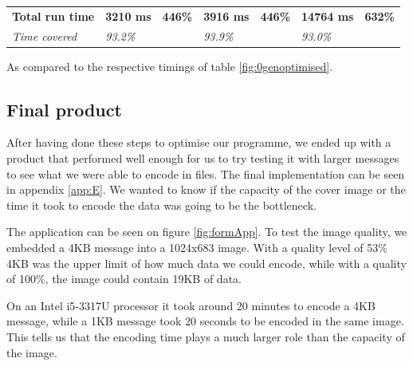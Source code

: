 \begin{table}[H]
\begin{tabular}{@{}lllllll@{}}
        \textbf{Total run time} & \textbf{3210 ms}                                                                          & \textbf{446\%}                                                                 & \textbf{3916 ms}                                                                           & \textbf{446\%}                                                                & \textbf{14764 ms}                                                                       & \textbf{632\%}                                                                \\
        \textit{Time covered}   & \textit{93.2\%}                                                                           & \textit{}                                                                      & \textit{93.9\%}                                                                            &                                                                               & \textit{93.0\%}                                                                         & \textit{}                                                                     \\ \bottomrule
    \end{tabular}
    \begin{tablenotes}
        \footnotesize{\item \textdagger As compared to the respective timings of table \ref{fig:0genoptimised}.}
    \end{tablenotes}
\end{table}

\subsection{Final product}
After having done these steps to optimise our programme, we ended up with a product that performed well enough for us to try testing it with larger messages to see what we were able to encode in files.
The final implementation can be seen in appendix \ref{app:E}.
We wanted to know if the capacity of the cover image or the time it took to encode the data was going to be the bottleneck.

The application can be seen on figure \ref{fig:formApp}.
To test the image quality, we embedded a 4KB message into a 1024x683 image.
With a quality level of 53\% 4KB was the upper limit of how much data we could encode, while with a quality of 100\%, the image could contain 19KB of data.

On an Intel{\textregistered} i5-3317U processor it took around 20 minutes to encode a 4KB message, while a 1KB message took 20 seconds to be encoded in the same image.
This tells us that the encoding time plays a much larger role than the capacity of the image.

